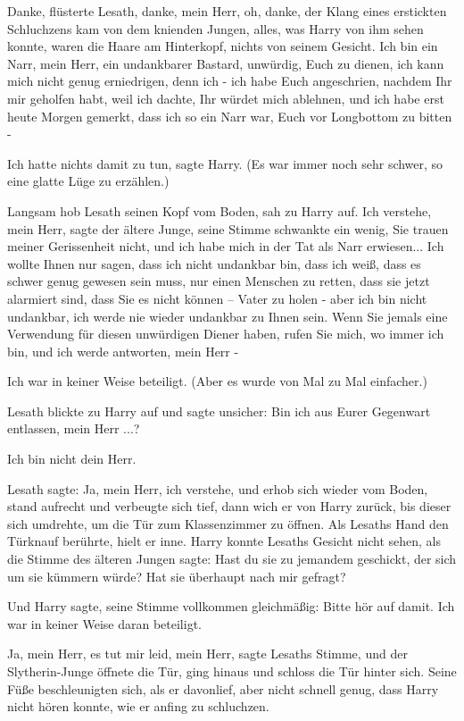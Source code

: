 \glqq Danke, \glqq  flüsterte Lesath, \glqq danke, mein Herr, oh, danke\grqq{},
der Klang eines erstickten Schluchzens kam von dem knienden Jungen, alles, was
Harry von ihm sehen konnte, waren die Haare am Hinterkopf, nichts von seinem
Gesicht. \glqq Ich bin ein Narr, mein Herr, ein undankbarer Bastard, unwürdig,
Euch zu dienen, ich kann mich nicht genug erniedrigen, denn ich - ich habe Euch
angeschrien, nachdem Ihr mir geholfen habt, weil ich dachte, Ihr würdet mich
ablehnen, und ich habe erst heute Morgen gemerkt, dass ich so ein Narr war, Euch
vor Longbottom zu bitten -\grqq{}

\glqq Ich hatte nichts damit zu tun\grqq{}, sagte Harry. (Es war immer noch sehr
schwer, so eine glatte Lüge zu erzählen.)

Langsam hob Lesath seinen Kopf vom Boden, sah zu Harry auf. \glqq Ich verstehe,
mein Herr\grqq{}, sagte der ältere Junge, seine Stimme schwankte ein wenig,
\glqq Sie trauen meiner Gerissenheit nicht, und ich habe mich in der Tat als
Narr erwiesen... Ich wollte Ihnen nur sagen, dass ich nicht undankbar bin, dass
ich weiß, dass es schwer genug gewesen sein muss, nur einen Menschen zu retten,
dass sie jetzt alarmiert sind, dass Sie es nicht können – Vater zu holen - aber
ich bin nicht undankbar, ich werde nie wieder undankbar zu Ihnen sein. Wenn Sie
jemals eine Verwendung für diesen unwürdigen Diener haben, rufen Sie mich, wo
immer ich bin, und ich werde antworten, mein Herr -\grqq{}

\glqq Ich war in keiner Weise beteiligt.\grqq{} (Aber es wurde von Mal zu Mal
einfacher.)

Lesath blickte zu Harry auf und sagte unsicher: \glqq Bin ich aus Eurer
Gegenwart entlassen, mein Herr ...?\grqq{}

\glqq Ich bin nicht dein Herr.\grqq{}

Lesath sagte: \glqq Ja, mein Herr, ich verstehe\grqq{}, und erhob sich wieder
vom Boden, stand aufrecht und verbeugte sich tief, dann wich er von Harry
zurück, bis dieser sich umdrehte, um die Tür zum Klassenzimmer zu öffnen. Als
Lesaths Hand den Türknauf berührte, hielt er inne. Harry konnte Lesaths Gesicht
nicht sehen, als die Stimme des älteren Jungen sagte: \glqq Hast du sie zu
jemandem geschickt, der sich um sie kümmern würde? Hat sie überhaupt nach mir
gefragt?\grqq{}

Und Harry sagte, seine Stimme vollkommen gleichmäßig: \glqq Bitte hör auf damit.
Ich war in keiner Weise daran beteiligt.\grqq{}

\glqq Ja, mein Herr, es tut mir leid, mein Herr\grqq{}, sagte Lesaths Stimme,
und der Slytherin-Junge öffnete die Tür, ging hinaus und schloss die Tür hinter
sich. Seine Füße beschleunigten sich, als er davonlief, aber nicht schnell
genug, dass Harry nicht hören konnte, wie er anfing zu schluchzen.

